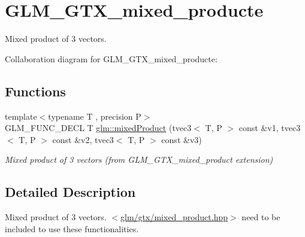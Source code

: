 \hypertarget{group__gtx__mixed__product}{\section{G\-L\-M\-\_\-\-G\-T\-X\-\_\-mixed\-\_\-producte}
\label{group__gtx__mixed__product}
}


Mixed product of 3 vectors.  


Collaboration diagram for G\-L\-M\-\_\-\-G\-T\-X\-\_\-mixed\-\_\-producte\-:
\subsection*{Functions}
\begin{DoxyCompactItemize}
\item 
\hypertarget{group__gtx__mixed__product_gaaee4cf80d69cb86de80f12af88b3c3af}{{\footnotesize template$<$typename T , precision P$>$ }\\G\-L\-M\-\_\-\-F\-U\-N\-C\-\_\-\-D\-E\-C\-L T \hyperlink{group__gtx__mixed__product_gaaee4cf80d69cb86de80f12af88b3c3af}{glm\-::mixed\-Product} (tvec3$<$ T, P $>$ const \&v1, tvec3$<$ T, P $>$ const \&v2, tvec3$<$ T, P $>$ const \&v3)}\label{group__gtx__mixed__product_gaaee4cf80d69cb86de80f12af88b3c3af}

\begin{DoxyCompactList}\small\item\em Mixed product of 3 vectors (from G\-L\-M\-\_\-\-G\-T\-X\-\_\-mixed\-\_\-product extension) \end{DoxyCompactList}\end{DoxyCompactItemize}


\subsection{Detailed Description}
Mixed product of 3 vectors. $<$\hyperlink{mixed__product_8hpp}{glm/gtx/mixed\-\_\-product.\-hpp}$>$ need to be included to use these functionalities. 